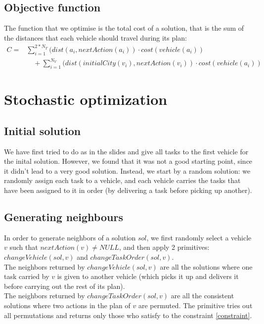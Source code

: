 \documentclass[11pt]{article}
\begin{document}
\subsection{Objective function}
The function that we optimise is the total cost of a solution, that is the sum of the distances that each vehicle should travel during its plan:
\begin{equation*}
\begin{split}
C = &\sum_{i=1}^{2*N_T}(dist(a_i,nextAction(a_i))\cdot cost(vehicle(a_i)) \\
 &\quad + \sum_{i=1}^{N_V}(dist(initialCity(v_i),nextAction(v_i))\cdot cost(vehicle(a_i))
\end{split}
\end{equation*}


\section{Stochastic optimization}

\subsection{Initial solution}
We have first tried to do as in the slides and give all tasks to the first vehicle for the inital solution. However, we found that it was not a good starting point, since it didn't lead to a very good solution. Instead, we start by a random solution: we randomly assign each task to a vehicle, and each vehicle carries the tasks that have been assigned to it in order (by delivering a task before picking up another).

\subsection{Generating neighbours}
In order to generate neighbors of a solution $sol$, we first randomly select a vehicle $v$ such that $nextAction(v) \neq NULL$, and then apply 2 primitives: $changeVehicle(sol,v)$ and $changeTaskOrder(sol,v)$.\\
The neighbors returned by $changeVehicle(sol,v)$ are all the solutions where one task carried by $v$ is given to another vehicle (which picks it up and delivers it before carrying out the rest of its plan).\\
The neighbors returned by $changeTaskOrder(sol,v)$ are all the consistent solutions where two actions in the plan of $v$ are permuted. The primitive tries out all permutations and returns only those who satisfy to the constraint \eqref{constraint}.
\end{document}
